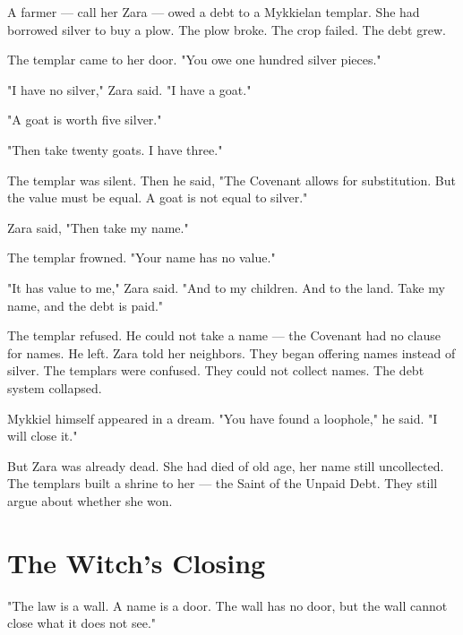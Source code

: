 \documentclass[10pt,twoside]{book}
\begin{document}
A farmer --- call her Zara --- owed a debt to a Mykkielan templar. She had borrowed silver to buy a plow. The plow broke. The crop failed. The debt grew.

The templar came to her door. "You owe one hundred silver pieces."

"I have no silver," Zara said. "I have a goat."

"A goat is worth five silver."

"Then take twenty goats. I have three."

The templar was silent. Then he said, "The Covenant allows for substitution. But the value must be equal. A goat is not equal to silver."

Zara said, "Then take my name."

The templar frowned. "Your name has no value."

"It has value to me," Zara said. "And to my children. And to the land. Take my name, and the debt is paid."

The templar refused. He could not take a name --- the Covenant had no clause for names. He left. Zara told her neighbors. They began offering names instead of silver. The templars were confused. They could not collect names. The debt system collapsed.

Mykkiel himself appeared in a dream. "You have found a loophole," he said. "I will close it."

But Zara was already dead. She had died of old age, her name still uncollected. The templars built a shrine to her --- the Saint of the Unpaid Debt. They still argue about whether she won.

\section*{The Witch's Closing}
"The law is a wall. A name is a door. The wall has no door, but the wall cannot close what it does not see."
\end{document}
